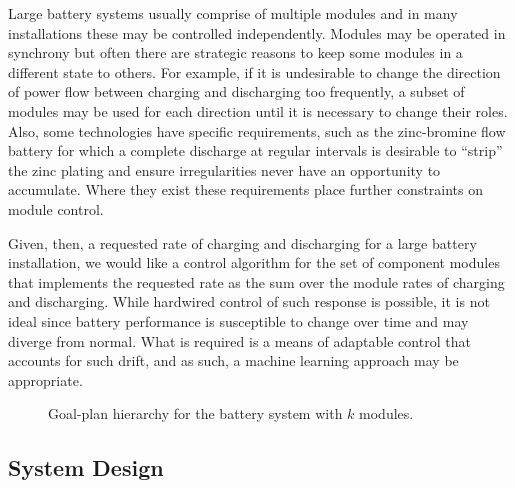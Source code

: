 Large battery systems usually comprise of multiple modules and in many installations these may be controlled independently.  Modules may be operated in synchrony but often there are strategic reasons to keep some modules in a different state to others.  For example, if it is undesirable to change the direction of power flow between charging and discharging too frequently, a subset of modules may be used for each direction until it is necessary to change their roles.  Also, some technologies have specific requirements, such as the zinc-bromine flow battery for which a complete discharge at regular intervals is desirable to ``strip'' the zinc plating and ensure irregularities never have an opportunity to accumulate.  Where they exist these requirements place further constraints on module control.

Given, then, a requested rate of charging and discharging for a large battery installation, we would like a control algorithm for the set of component modules that implements the requested rate as the sum over the module rates of charging and discharging.  While hardwired control of such response is possible, it is not ideal since battery performance is susceptible to change over time and may diverge from normal. What is required is a means of adaptable control that accounts for such drift, and as such, a machine learning approach may be appropriate. 

\begin{figure*}[ht]
\begin{center}

\end{center}
\caption{Goal-plan hierarchy for the battery system with $k$ modules.}
\label{fig:gptree}
\end{figure*}


\subsection{System Design}\label{subsec:design}

